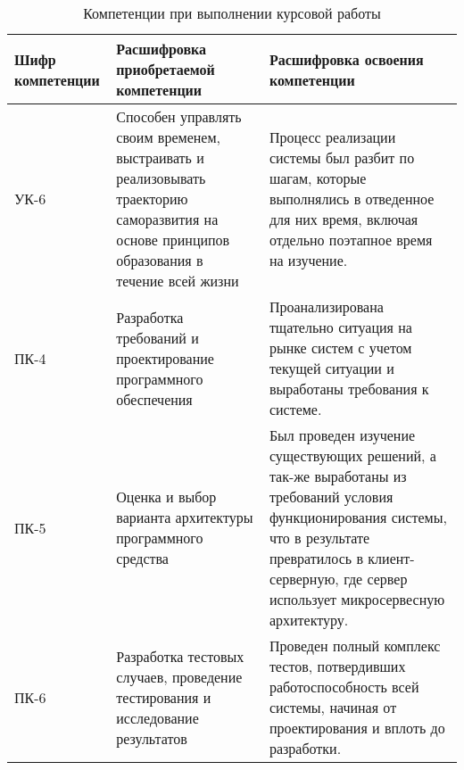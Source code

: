 \captionsetup[table]{justification=raggedright,singlelinecheck=false}
\begin{table}[h!]
\centering
\caption{Компетенции при выполнении курсовой работы}
\begin{tabular}{|p{3cm}|p{5cm}|p{7cm}|} 
    \hline
    Шифр \newline компетенции & Расшифровка \newline приобретаемой \newline компетенции & Расшифровка освоения \newline компетенции \\[0.5ex] 
        \hline
        УК-6 & Способен управлять своим временем, выстраивать и реализовывать траекторию саморазвития на основе принципов образования в течение всей жизни &  Процесс реализации системы был разбит по шагам, которые выполнялись в отведенное для них время, включая отдельно поэтапное время на изучение.  \\ \hline
        ПК-4 & Разработка требований и проектирование программного обеспечения & Проанализирована тщательно ситуация на рынке систем с учетом текущей ситуации и выработаны требования к системе. \\  \hline
        ПК-5 & Оценка и выбор варианта архитектуры программного средства & Был проведен изучение существующих решений, а так-же выработаны из требований условия функционирования системы, что в результате превратилось в клиент-серверную, где сервер использует микросервесную архитектуру. \\  \hline
        ПК-6 & Разработка тестовых случаев, проведение тестирования и исследование результатов & Проведен полный комплекс тестов, потвердивших работоспособность всей системы, начиная от проектирования и вплоть до разработки.\\ 
 \hline
\end{tabular}

\label{table:1}
\end{table}

